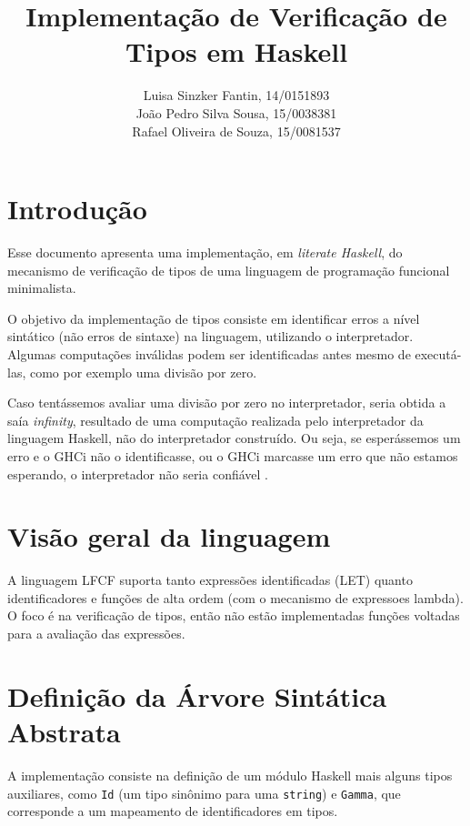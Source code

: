 \documentclass[12pt]{article}
\title{Implementa\c c\~{a}o de Verifica\c c\~{a}o de Tipos em Haskell}
\author{Luisa Sinzker Fantin, 14/0151893\\
        Jo\~{a}o Pedro Silva Sousa, 15/0038381\\
        Rafael Oliveira de Souza, 15/0081537\\
}
\begin{document}
\maketitle

\section{Introdu\c c\~{a}o}

Esse documento apresenta uma implementa\c c\~{a}o,
em \emph{literate Haskell}, do mecanismo de verifica\c c\~{a}o
de tipos de uma linguagem de programa\c c\~{a}o funcional
minimalista.

O objetivo da implementa\c c\~{a}o de tipos consiste em identificar
erros a n\'{i}vel sint\'{a}tico (n\~{a}o erros de sintaxe) na linguagem,
utilizando o interpretador. Algumas computa\c c\~{o}es inv\'{a}lidas podem
ser identificadas antes mesmo de execut\'{a}-las, como por exemplo uma
divis\~{a}o por zero.

Caso tent\'{a}ssemos avaliar uma divis\~{a}o por zero no interpretador,
seria obtida a sa\'{i}a \emph{infinity}, resultado de uma computa\c c\~{a}o
realizada pelo interpretador da linguagem Haskell, n\~{a}o do interpretador
constru\'{i}do. Ou seja, se esper\'{a}ssemos um erro e o GHCi n\~{a}o o
identificasse, ou o GHCi marcasse um erro que n\~{a}o estamos esperando,
o interpretador n\~{a}o seria confi\'{a}vel \cite{Shriram}.


\section{Vis\~{a}o geral da linguagem}

A linguagem LFCF suporta tanto express\~{o}es
identificadas (LET) quanto identificadores e fun\c c\~{o}es de alta ordem
(com o mecanismo de expressoes lambda). O foco \'{e} na
verifica\c c\~{a}o de tipos, ent\~{a}o n\~{a}o est\~{a}o
implementadas fun\c c\~{o}es voltadas para a avalia\c c\~{a}o
das express\~{o}es. 


\section{Defini\c c\~{a}o da \'{A}rvore Sint\'{a}tica Abstrata}

A implementa\c c\~{a}o consiste na defini\c c\~{a}o de
um m\'{o}dulo Haskell mais alguns tipos auxiliares, como
\texttt{Id} (um tipo sin\^{o}nimo para uma \texttt{string}) e
\texttt{Gamma}, que corresponde a um mapeamento de
identificadores em tipos. 
\end{document}
